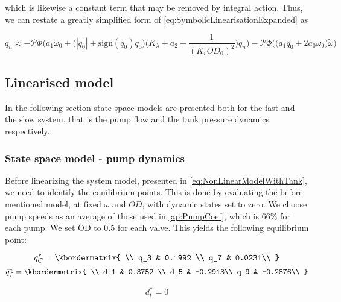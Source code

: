 which is likewise a constant term that may be removed by integral action. Thus, we can restate a greatly simplified form of \cref{eq:SymbolicLinearisationExpanded} as

\begin{equation}\label{eq:SymbolicLinearisationSimplified}
	\dot{q}_n \approx -\mathcal{P}\Phi\Bigg(a_1\omega_0 + \Big(|q_0|+\text{sign}(q_0)q_0\Big)\Bigg(K_\lambda + a_2 + \frac{1}{(K_v OD_0)^2}\Bigg) \tilde{q}_n \Bigg) -  \mathcal{P}\Phi\Bigg(\Big(a_1 q_0 + 2a_0\omega_0\Big) \tilde{\omega}\Bigg)
\end{equation}

\clearpage

\subsection{Linearised model}
In the following section state space models are presented both for the fast and the slow system, that is the pump flow and the tank pressure dynamics respectively. 

\subsubsection{State space model - pump dynamics}
Before linearizing the system model, presented in \cref{eq:NonLinearModelWithTank}, we need to identify the equilibrium points. This is done by evaluating the before mentioned model, at fixed $ \omega $ and $ OD $, with dynamic states set to zero. We choose pump speeds as an average of those used in \cref{ap:PumpCoef}, which is $ 66\% $ for each pump. We set OD to $ 0.5 $ for each valve. This yields the following equilibrium point:

	\begin{equation}
	q_C^* = \kbordermatrix{
		\\
		q_3 & 0.1992 \\ 
		q_7 & 0.0231\\
	}
\end{equation}
	\begin{equation}
	\bar{q}_f^* = \kbordermatrix{
		\\
		d_1 & 0.3752 \\ 
		d_5 & -0.2913\\
		q_9 & -0.2876\\
	}
	\end{equation}

\begin{equation}
	d_t^* = 0
\end{equation}


